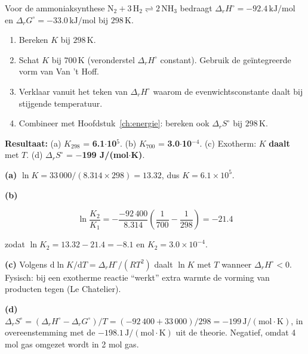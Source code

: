 \begin{oefening}
Voor de ammoniaksynthese \(\mathrm{N_2 + 3\,H_2 \rightleftharpoons 2\,NH_3}\) bedraagt \(\Delta_r H^\circ = -92.4\,\mathrm{kJ/mol}\) en \(\Delta_r G^\circ = -33.0\,\mathrm{kJ/mol}\) bij \(298\,\mathrm{K}\).

\begin{enumerate}
\item[(a)]
  Bereken \(K\) bij \(298\,\mathrm{K}\).
\item[(b)]
  Schat \(K\) bij \(700\,\mathrm{K}\) (veronderstel \(\Delta_r H^\circ\) constant). Gebruik de geïntegreerde vorm van Van 't Hoff.
\item[(c)]
  Verklaar vanuit het teken van \(\Delta_r H^\circ\) waarom de evenwichtsconstante daalt bij stijgende temperatuur.
\item[(d)]
  Combineer met Hoofdstuk~\ref{ch:energie}: bereken ook \(\Delta_r S^\circ\) bij \(298\,\mathrm{K}\).
\end{enumerate}
\end{oefening}
\begin{oplossing}
\textbf{Resultaat:} (a) \(K_{298}\) = \textbf{6.1\ensuremath{\cdot{}}10\ensuremath{^{5}}}. (b) \(K_{700}\) = \textbf{3.0\ensuremath{\cdot{}}10\ensuremath{^{-4}}}. (c) Exotherm: \(K\) \textbf{daalt} met \(T\). (d) \(\Delta_r S^\circ\) = \textbf{\ensuremath{-}199 J/(mol\ensuremath{\cdot{}}K)}.

\textbf{(a)} \(\ln K = 33\,000/(8.314 \times 298) = 13.32\), dus \(K = 6.1\times10^{5}\).

\textbf{(b)}

\[
\ln\frac{K_2}{K_1} = -\frac{-92\,400}{8.314}\left(\frac{1}{700} - \frac{1}{298}\right) = -21.4
\]

zodat \(\ln K_2 = 13.32 - 21.4 = -8.1\) en \(K_2 = 3.0\times10^{-4}\).

\textbf{(c)} Volgens \(\mathrm{d}\ln K/\mathrm{d}T = \Delta_r H^\circ/(RT^2)\) daalt \(\ln K\) met \(T\) wanneer \(\Delta_r H^\circ < 0\). Fysisch: bij een exotherme reactie ``werkt'' extra warmte de vorming van producten tegen (Le Chatelier).

\textbf{(d)} \(\Delta_r S^\circ = (\Delta_r H^\circ - \Delta_r G^\circ)/T = (-92\,400 + 33\,000)/298 = -199\,\mathrm{J/(mol\cdot K)}\), in overeenstemming met de \(-198.1\,\mathrm{J/(mol\cdot K)}\) uit de theorie. Negatief, omdat 4 mol gas omgezet wordt in 2 mol gas.
\end{oplossing}

